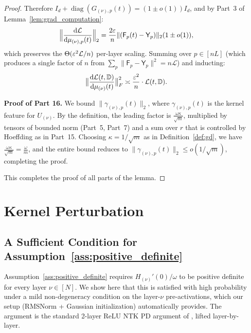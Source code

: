 \documentclass[11pt]{article}
\let\citet\citep
\theoremstyle{plain}
\renewcommand{\d}{\mathrm{d}}
\DeclareMathOperator{\diag}{diag}
\begin{document}
\begin{proof}
    Therefore $I_d + \diag(G_{(\nu),p}(t)) = (1\pm o(1))I_d$, and by Part~3 of Lemma~\ref{lem:grad_computation}:
    \begin{align*}
        \Big\|\frac{\d{\cal L}}{\d\mu_{(\nu),p}(t)}\Big\|_2 = \frac{2\varepsilon}{n}\|({\sf F}_p(t)-{\sf Y}_p)\|_2(1\pm o(1)),
    \end{align*}
    which preserves the $\Theta(\varepsilon^2{\cal L}/n)$ per-layer scaling. Summing over $p\in[nL]$ (which produces a single factor of $n$ from $\sum_p \|\mathsf{F}_p-\mathsf{Y}_p\|^2 = n\mathcal{L}$) and inducting:
    \begin{align*}
        \big\| \frac{\d {\cal L}(t, \mathbb{D})}{\d \mu_{(\nu)}(t)} \big\|_F^2 \asymp \frac{\varepsilon^2}{n} \cdot {\cal L}(t, \mathbb{D}).
    \end{align*}

    {\bf Proof of Part 16.}
    We bound $\|\gamma_{(\nu),p}(t)\|_2$, where $\gamma_{(\nu),p}(t)$ is the kernel feature for $U_{(\nu)}$. By the definition, the leading factor is $\frac{\omega \kappa}{\sqrt{m}}$, multiplied by tensors of bounded norm (Part~5, Part~7) and a sum over $r$ that is controlled by Hoeffding as in Part~15. Choosing $\kappa = 1/\sqrt{m}$ as in Definition~\ref{def:gd}, we have $\frac{\omega\kappa}{\sqrt{m}} = \frac{\omega}{m}$, and the entire bound reduces to $\| \gamma_{(\nu),p}(t)\|_2 \leq o(1/\sqrt{m})$, completing the proof.

This completes the proof of all parts of the lemma.
\end{proof}


\newpage%






\section{Kernel Perturbation}\label{app:proof_lperturbations}

\subsection{A Sufficient Condition for Assumption~\ref{ass:positive_definite}}\label{app_sub:pd_sufficient}

Assumption~\ref{ass:positive_definite} requires $H_{(\nu)}'(0)/\omega$ to be positive definite for every layer $\nu \in [N]$. We show here that this is satisfied with high probability under a mild non-degeneracy condition on the layer-$\nu$ pre-activations, which our setup (RMSNorm + Gaussian initialization) automatically provides. The argument is the standard 2-layer ReLU NTK PD argument of \citet{dzps19}, lifted layer-by-layer.
\end{document}
